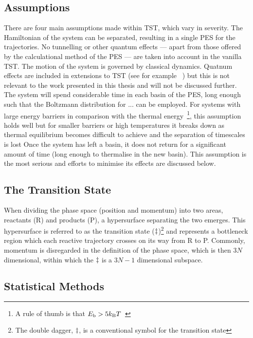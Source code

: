 \subsection{Assumptions}
There are four main assumptions made within TST, which vary in severity.
The Hamiltonian of the system can be separated, resulting in a single PES for the trajectories.
No tunnelling or other quantum effects --- apart from those offered by the calculational method of the PES --- are taken into account in the vanilla TST.
The motion of the system is governed by classical dynamics.
Quatnum effects are included in extensions to TST (see for example \cite{qtst-hj-1997, qtst-hj-1998, qtst-hj-2009}~\citemiss) but this is not relevant to the work presented in this thesis and will not be discussed further.
The system will spend considerable time in each basin of the PES, long enough such that the Boltzmann distribution for ... can be employed.
For systems with large energy barriers in comparison with the thermal energy~\footnote{A rule of thumb is that $E_\text{b} > 5k_\text{B} T$~\citemiss}, this assumption holds well but for smaller barriers or high temperatures it breaks down as thermal equilibrium becomes difficult to achieve and the separation of timescales is lost
Once the system has left a basin, it does not return for a significant amount of time (long enough to thermalise in the new basin).
This assumption is the most serious and efforts to minimise its effects are discussed below.

\subsection{The Transition State}


When dividing the phase space (position and momentum) into two areas, reactants (R) and products (P), a hypersurface separating the two emerges.
This hypersurface is referred to as the transition state ($\ddagger$)\footnote{The double dagger, $\ddagger$, is a conventional symbol for the transition state} and represents a bottleneck region which each reactive trajectory crosses on its way from R to P.
Commonly, momentum is disregarded in the definition of the phase space, which is then  $3N$ dimensional, within which the $\ddagger$ is a $3N-1$ dimensional subspace.

\subsection{Statistical Methods}

